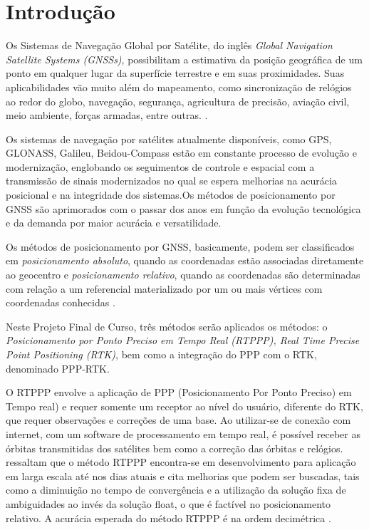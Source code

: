 \chapter{Introdução}

Os Sistemas de Navegação Global por Satélite, do inglês \textit{Global Navigation Satellite Systems (GNSSs)}, possibilitam a estimativa da posição geográfica de um ponto em qualquer lugar da superfície terrestre e em suas proximidades. Suas aplicabilidades vão muito além do mapeamento, como sincronização de relógios ao redor do globo, navegação, segurança, agricultura de precisão, aviação civil, meio ambiente, forças armadas, entre outras. \citep{liu2018real} \citep{monico2008}.

Os sistemas de navegação por satélites atualmente disponíveis, como GPS, GLONASS, Galileu, Beidou-Compass estão em constante processo de evolução e modernização, englobando os seguimentos de controle e espacial com a transmissão de sinais modernizados no qual se espera melhorias na acurácia posicional e na integridade dos sistemas.Os métodos de posicionamento por GNSS são aprimorados com o passar dos anos em função da evolução tecnológica e da demanda por maior acurácia e versatilidade.

Os métodos de posicionamento por GNSS, basicamente, podem ser classificados em \textit{posicionamento absoluto}, quando as coordenadas estão associadas diretamente ao geocentro e \textit{posicionamento relativo}, quando as coordenadas são determinadas com relação a um referencial materializado por um ou mais vértices com coordenadas conhecidas \citep{monico2008}.

Neste Projeto Final de Curso, três métodos serão aplicados os métodos: o \textit{Posicionamento por Ponto Preciso em Tempo Real (RTPPP), Real Time Precise Point Positioning (RTK)}, bem como a integração do PPP com o RTK, denominado PPP-RTK.


O RTPPP envolve a aplicação de PPP (Posicionamento Por Ponto Preciso) em Tempo real) e requer somente um receptor ao nível do usuário, diferente do RTK, que requer observações e correções de uma base.  Ao utilizar-se de conexão com internet, com um software de processamento em tempo real, é possível receber as órbitas transmitidas dos satélites bem como a correção das órbitas e relógios. \citet{marques2014ppp} ressaltam que o método RTPPP encontra-se em desenvolvimento para aplicação em larga escala até nos dias atuais e cita melhorias que podem ser buscadas, tais como a diminuição no tempo de convergência e a utilização da solução fixa de ambiguidades ao invés da solução float, o que é factível no posicionamento relativo. A acurácia esperada do método RTPPP é na ordem decimétrica \citep{lima}.

